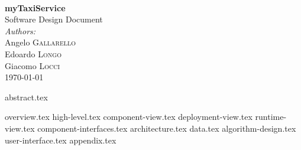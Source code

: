 \documentclass[12pt, a4paper]{article}
\begin{document}
\begin{titlepage}
 


\HRule \\[0.4cm]
{ \huge \bfseries myTaxiService} \\[0.2cm]%
	{\Large Software Design Document}
\HRule \\[1.5cm]
 


\large \emph{Authors:}\\
Angelo  \textsc{Gallarello}\\
Edoardo  \textsc{Longo}\\
Giacomo  \textsc{Locci}\\[1.5cm]


{\large \today} %



\vfill %

\end{titlepage}

\newpage

\tableofcontents

\newpage

\listoffigures

\newpage

{abstract.tex}

{overview.tex}
\newpage
{high-level.tex}
\newpage
{component-view.tex}
\newpage
{deployment-view.tex}
\newpage
{runtime-view.tex}
\newpage
{component-interfaces.tex}
\newpage
{architecture.tex}
\newpage
{data.tex}
\newpage
{algorithm-design.tex}
\newpage
{user-interface.tex}
{appendix.tex}
\end{document}
